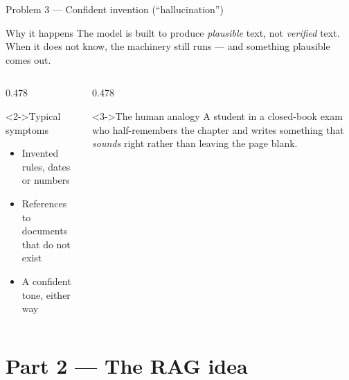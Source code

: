 \documentclass[aspectratio=169,11pt]{beamer}
\begin{document}
\begin{frame}{Problem 3 --- Confident invention (``hallucination'')}
  \begin{block}{Why it happens}
    The model is built to produce \emph{plausible} text, not \emph{verified}
    text. When it does not know, the machinery still runs --- and something
    plausible comes out.
  \end{block}
  \medskip
  \begin{columns}[T,onlytextwidth]
    \begin{column}{0.478\textwidth}
      \begin{alertblock}<2->{Typical symptoms}
        \begin{itemize}
          \item Invented rules, dates or numbers
          \item References to documents that do not exist
          \item A confident tone, either way
        \end{itemize}
      \end{alertblock}
    \end{column}
    \begin{column}{0.478\textwidth}
      \begin{exampleblock}<3->{The human analogy}
        A student in a closed-book exam who half-remembers the chapter and
        writes something that \emph{sounds} right rather than leaving
        the page blank.
      \end{exampleblock}
    \end{column}
  \end{columns}
  \medskip
  \centering
\end{frame}

\section{Part 2 --- The RAG idea}
\end{document}
